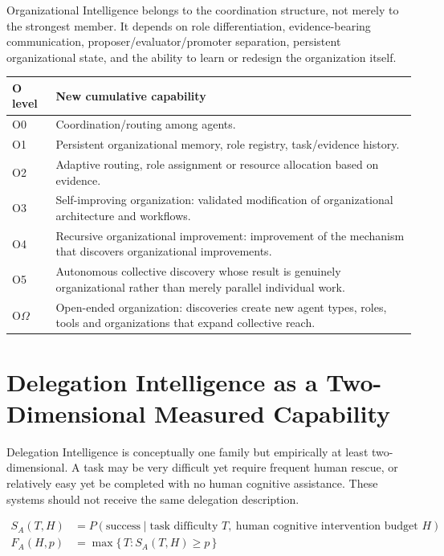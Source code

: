 \documentclass[11pt]{article}
\theoremstyle{definition}
\newcommand{\Om}{\ensuremath{\Omega}}
\newcommand{\SA}{\ensuremath{S_A(T,H)}}
\newcommand{\FA}{\ensuremath{F_A(H,p)}}
\begin{document}
Organizational Intelligence belongs to the coordination structure, not merely to the strongest member. It depends on role differentiation, evidence-bearing communication, proposer/evaluator/promoter separation, persistent organizational state, and the ability to learn or redesign the organization itself.

\begin{table}[h]
\centering\small
\begin{tabularx}{\textwidth}{@{}lY@{}}
\toprule
O level & New cumulative capability \\
\midrule
O0 & Coordination/routing among agents. \\
O1 & Persistent organizational memory, role registry, task/evidence history. \\
O2 & Adaptive routing, role assignment or resource allocation based on evidence. \\
O3 & Self-improving organization: validated modification of organizational architecture and workflows. \\
O4 & Recursive organizational improvement: improvement of the mechanism that discovers organizational improvements. \\
O5 & Autonomous collective discovery whose result is genuinely organizational rather than merely parallel individual work. \\
O\Om{} & Open-ended organization: discoveries create new agent types, roles, tools and organizations that expand collective reach. \\
\bottomrule
\end{tabularx}
\end{table}

\section{Delegation Intelligence as a Two-Dimensional Measured Capability}

Delegation Intelligence is conceptually one family but empirically at least two-dimensional. A task may be very difficult yet require frequent human rescue, or relatively easy yet be completed with no human cognitive assistance. These systems should not receive the same delegation description.

\begin{align}
\SA{} &= P(\text{success} \mid \text{task difficulty } T,\ \text{human cognitive intervention budget } H)\\
\FA{} &= \max\{\,T : \SA{} \ge p\,\}
\end{align}
\end{document}
